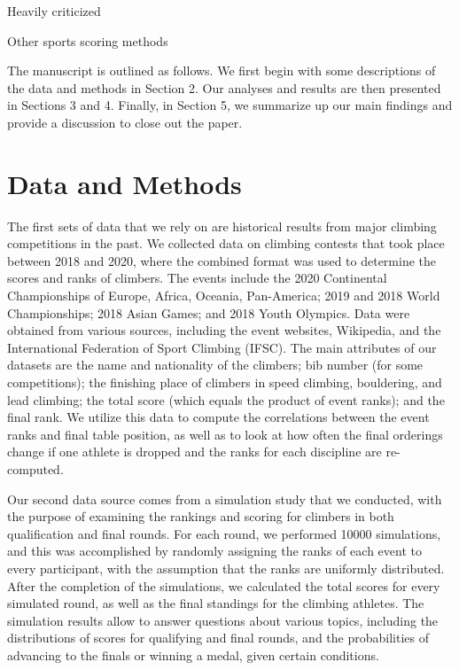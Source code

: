 \documentclass[12pt]{article}
\begin{document}
Heavily criticized

Other sports scoring methods

The manuscript is outlined as follows. We first begin with some
descriptions of the data and methods in Section 2. Our analyses and
results are then presented in Sections 3 and 4. Finally, in Section 5,
we summarize up our main findings and provide a discussion to close out
the paper.

\hypertarget{data-and-methods}{%
\section{Data and Methods}\label{data-and-methods}}

The first sets of data that we rely on are historical results from major
climbing competitions in the past. We collected data on climbing
contests that took place between 2018 and 2020, where the combined
format was used to determine the scores and ranks of climbers. The
events include the 2020 Continental Championships of Europe, Africa,
Oceania, Pan-America; 2019 and 2018 World Championships; 2018 Asian
Games; and 2018 Youth Olympics. Data were obtained from various sources,
including the event websites, Wikipedia, and the International
Federation of Sport Climbing (IFSC). The main attributes of our datasets
are the name and nationality of the climbers; bib number (for some
competitions); the finishing place of climbers in speed climbing,
bouldering, and lead climbing; the total score (which equals the product
of event ranks); and the final rank. We utilize this data to compute the
correlations between the event ranks and final table position, as well
as to look at how often the final orderings change if one athlete is
dropped and the ranks for each discipline are re-computed.

Our second data source comes from a simulation study that we conducted,
with the purpose of examining the rankings and scoring for climbers in
both qualification and final rounds. For each round, we performed 10000
simulations, and this was accomplished by randomly assigning the ranks
of each event to every participant, with the assumption that the ranks
are uniformly distributed. After the completion of the simulations, we
calculated the total scores for every simulated round, as well as the
final standings for the climbing athletes. The simulation results allow
to answer questions about various topics, including the distributions of
scores for qualifying and final rounds, and the probabilities of
advancing to the finals or winning a medal, given certain conditions.
\end{document}
